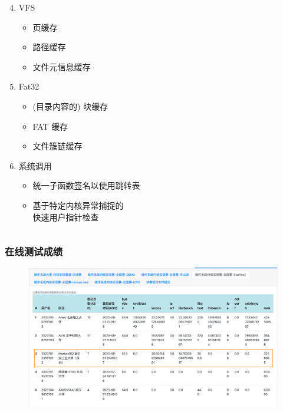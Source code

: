 \begin{frame}
\begin{columns}
        \begin{column}{.5\linewidth}
            \begin{enumerate}
                \setcounter{enumi}{3}
                \item VFS
                      \begin{itemize}
                          \item 页缓存
                          \item 路径缓存
                          \item 文件元信息缓存
                      \end{itemize}
                \item Fat32
                      \begin{itemize}
                          \item (目录内容的) 块缓存
                          \item FAT 缓存
                          \item 文件簇链缓存
                      \end{itemize}
                \item 系统调用
                      \begin{itemize}
                          \item 统一子函数签名以使用跳转表
                          \item 基于特定内核异常捕捉的\\
                                快速用户指针检查
                      \end{itemize}
            \end{enumerate}
        \end{column}
    \end{columns}
\end{frame}

\begin{frame}
    \frametitle{在线测试成绩}
    \begin{figure}
        \centering
        \includegraphics[width=.7\textwidth]{assets/rank.png}
    \end{figure}

\end{frame}

